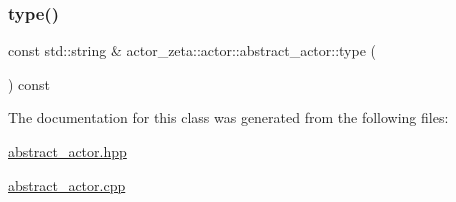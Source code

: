 \mbox{\label{classactor__zeta_1_1actor_1_1abstract__actor_abebf7096ab054eb2be64151f589d70d7}} 
\subsubsection{\texorpdfstring{type()}{type()}}
{\footnotesize\ttfamily const std\+::string \& actor\+\_\+zeta\+::actor\+::abstract\+\_\+actor\+::type (\begin{DoxyParamCaption}{ }\end{DoxyParamCaption}) const}



The documentation for this class was generated from the following files\+:\begin{DoxyCompactItemize}
\item 
\hyperlink{abstract__actor_8hpp}{abstract\+\_\+actor.\+hpp}\item 
\hyperlink{abstract__actor_8cpp}{abstract\+\_\+actor.\+cpp}\end{DoxyCompactItemize}
